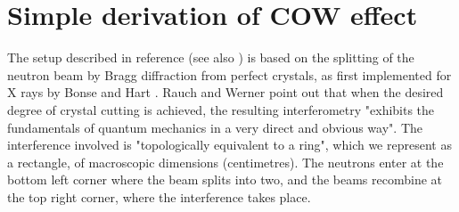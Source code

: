 \documentclass[twocolumn,reprint,amsmath,amssymb]{revtex4}
\begin{document}
\section{Simple derivation of COW effect}
\label{sec:SimpleCOW}


The setup described in reference \cite{1} (see also \cite{4}) is based on the splitting of the
neutron beam by Bragg diffraction from perfect crystals, as first implemented for X
rays by Bonse and Hart \cite{6new}. Rauch and Werner \cite{4} point out that when the desired degree of crystal cutting is achieved, the resulting interferometry "exhibits the fundamentals of quantum mechanics in a very direct and obvious way". The interference involved is "topologically equivalent to a ring", which we represent as a rectangle, of macroscopic dimensions (centimetres). The neutrons enter at the bottom left corner where the beam splits
into two, and the beams recombine at the top right corner, where the interference
takes place.
\end{document}
